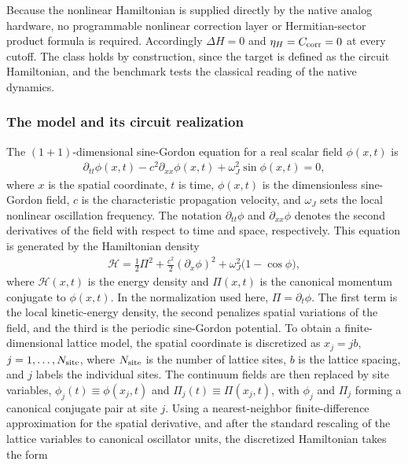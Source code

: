 \documentclass[pra,twocolumn,superscriptaddress,nofootinbib,floatfix]{revtex4-2}
\theoremstyle{remark}
\newcommand{\revcolor}{\color{blue}}
\DeclareRobustCommand{\rev}[1]{{\revcolor #1}}
\begin{document}
Because the nonlinear Hamiltonian is supplied directly by the native analog hardware, no programmable nonlinear correction layer or Hermitian-sector product formula is required. \rev{Accordingly \(\Delta H=0\) and \(\eta_H=C_{\rm corr}=0\) at every cutoff.} \rev{The class holds by construction, since the target is defined as the circuit Hamiltonian, and the benchmark tests the classical reading of the native dynamics.}

\subsubsection{The model and its circuit realization}
\label{subsec:sg-model}

The $(1+1)$-dimensional sine-Gordon equation for a real scalar field $\phi(x,t)$ is
\begin{align}
\partial_{tt}\phi(x,t) - c^2\partial_{xx}\phi(x,t) + \omega_J^2\sin\phi(x,t) = 0,
\label{eq:sinegordon}
\end{align}
where $x$ is the spatial coordinate, $t$ is time, $\phi(x,t)$ is the dimensionless sine-Gordon field, $c$ is the characteristic propagation velocity, and $\omega_J$ sets the local nonlinear oscillation frequency. The notation $\partial_{tt}\phi$ and $\partial_{xx}\phi$ denotes the second derivatives of the field with respect to time and space, respectively. This equation is generated by the Hamiltonian density
\begin{align}
\mathcal H =\tfrac12\Pi^2+ \tfrac{c^2}{2}(\partial_x\phi)^2+ \omega_J^2\bigl(1-\cos\phi\bigr),
\label{eq:sg-density}
\end{align}
where $\mathcal H(x,t)$ is the energy density and $\Pi(x,t)$ is the canonical momentum conjugate to $\phi(x,t)$. In the normalization used here, $\Pi=\partial_t\phi$. The first term is the local kinetic-energy density, the second penalizes spatial variations of the field, and the third is the periodic sine-Gordon potential. To obtain a finite-dimensional lattice model, the spatial coordinate is discretized as \(x_j=jb\), \(j=1,\ldots,N_{\rm site}\), where $N_{\rm site}$ is the number of lattice sites, $b$ is the lattice spacing, and $j$ labels the individual sites. \rev{The continuum fields are then replaced by site variables, \(\phi_j(t)\equiv \phi(x_j,t)\) and \(\Pi_j(t)\equiv \Pi(x_j,t)\), with $\phi_j$ and $\Pi_j$ forming a canonical conjugate pair at site $j$.} Using a nearest-neighbor finite-difference approximation for the spatial derivative, and after the standard rescaling of the lattice variables to canonical oscillator units, the discretized Hamiltonian takes the form
\end{document}
